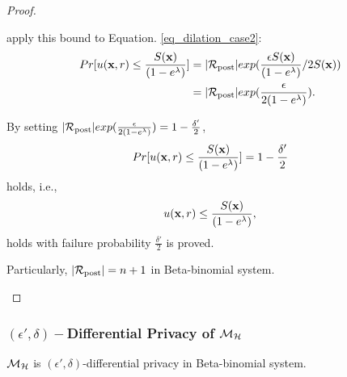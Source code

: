 \documentclass{article}
\begin{document}
\begin{proof}
\begin{itemize}
          apply this bound to Equation. \ref{eq_dilation_case2}:
          \begin{equation*}
          \begin{split}
          Pr[u(\textbf{x}, {r}) \leq \frac{S(\textbf{x})}{(1 - e ^ {\lambda})}] 
          & = |\mathcal{R}_{\textup{post}}|exp(\frac{\epsilon S(\textbf{x})}{(1 - e ^ {\lambda})}/2 S(\textbf{x}))\\
          & = |\mathcal{R}_{\textup{post}}|exp(\frac{\epsilon}{2 (1 - e ^ {\lambda})}).\\
          \end{split}
          \end{equation*}

          By setting $|\mathcal{R}_{\textup{post}}|exp(\frac{\epsilon}{2 (1 - e ^ {\lambda})}) = 1 - \frac{\delta'}{2}$, 
          \begin{equation*}
          \begin{split}
          Pr[u(\textbf{x}, {r}) \leq \frac{S(\textbf{x})}{(1 - e ^ {\lambda})}] = 1 - \frac{\delta'}{2}
          \end{split}
          \end{equation*}
          holds, i.e.,
          \begin{equation*}
          u(\textbf{x}, {r})
          \leq 
          \frac{S(\textbf{x})}{(1 - e ^ {\lambda})},
          \end{equation*}         
          holds with failure probability $\frac{\delta'}{2}$ is proved.

          Particularly, $|\mathcal{R}_{\textup{post}}| = n + 1$ in Beta-binomial system.

      \end{itemize}


\end{proof}

\subsubsection{$(\epsilon', \delta)-$Differential Privacy of $\mathcal{M}_{\mathcal{H}}$}
\begin{lem}
\label{lem_hexpmech_privacy}
$\mathcal{M}_{\mathcal{H}}$ is $(\epsilon', \delta)$-differential privacy in Beta-binomial system.
\end{lem}
\end{document}
